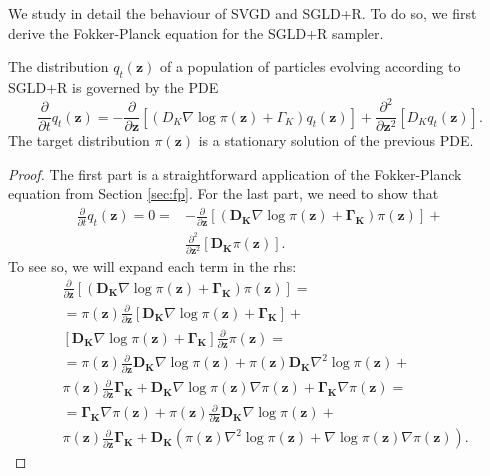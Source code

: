 We study in detail the behaviour of SVGD and SGLD+R. To do so, we first derive the Fokker-Planck equation for the SGLD+R sampler.
\begin{proposition}
The distribution $q_t(\bm{z})$ of a population of particles evolving according to SGLD+R is governed by the PDE
$$
\frac{\partial}{\partial t} q_t(\bm{z}) = -\frac{\partial}{\partial \bm{z}} \left[ (D_K \nabla \log \pi(\bm{z}) + \Gamma_K) q_t(\bm{z})\right] + \frac{\partial^2}{\partial \bm{z}^2} \left[ D_K q_t(\bm{z})  \right].
$$
The target distribution $\pi(\bm{z})$ is a stationary solution of the previous PDE.
\end{proposition}
\begin{proof}
The first part is a straightforward application of the Fokker-Planck equation from Section \ref{sec:fp}. For the last part, we need to show that
\begin{align*}
\frac{\partial}{\partial t} q_t(\bm{z}) = 0 = &-\frac{\partial}{\partial \bm{z}} \left[ (\mathbf{D_K} \nabla \log \pi(\bm{z}) + \mathbf{\Gamma_K}) \pi(\bm{z})\right] + \\& \frac{\partial^2}{\partial \bm{z}^2} \left[ \mathbf{D_K} \pi(\bm{z})  \right].
\end{align*}
To see so, we will expand each term in the rhs:
\begin{align*}
& \frac{\partial}{\partial \bm{z}} \left[ (\mathbf{D_K} \nabla \log \pi(\bm{z}) + \mathbf{\Gamma_K}) \pi(\bm{z})\right] = \\
&= \pi(\bm{z})\frac{\partial}{\partial \bm{z}} \left[ \mathbf{D_K} \nabla \log \pi(\bm{z}) + \mathbf{\Gamma_K} \right] + \\& \left[ \mathbf{D_K} \nabla \log \pi(\bm{z}) + \mathbf{\Gamma_K} \right] \frac{\partial}{\partial \bm{z}} \pi(\bm{z}) = \\
&= \pi(\bm{z})\frac{\partial}{\partial \bm{z}}\mathbf{D_K} \nabla \log \pi(\bm{z})+ \pi(\bm{z})\mathbf{D_K} \nabla^2 \log \pi(\bm{z}) + \\& \pi(\bm{z}) \frac{\partial}{\partial \bm{z}} \mathbf{\Gamma_K} + \mathbf{D_K} \nabla \log \pi(\bm{z}) \nabla \pi(\bm{z})  + \mathbf{\Gamma_K} \nabla \pi(\bm{z}) = \\
&= \mathbf{\Gamma_K} \nabla \pi(\bm{z}) + \pi(\bm{z})\frac{\partial}{\partial \bm{z}}\mathbf{D_K}\nabla \log \pi(\bm{z}) +  \\&
\pi(\bm{z}) \frac{\partial}{\partial \bm{z}} \mathbf{\Gamma_K} +
\mathbf{D_K}(\pi(\bm{z})\nabla^2 \log \pi(\bm{z}) + \nabla \log \pi(\bm{z}) \nabla \pi(\bm{z})).
\end{align*}

\end{proof}
